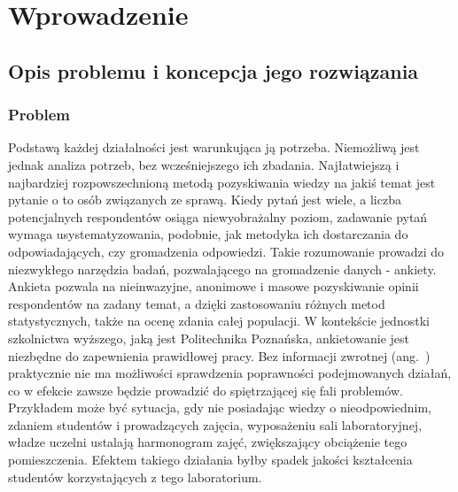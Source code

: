 \chapter{Wprowadzenie}
\label{Chapter1}

\section{Opis problemu i koncepcja jego rozwiązania}
\label{Chapter11}

\subsection{Problem}
\label{Chapter111}

Podstawą każdej działalności jest warunkująca ją potrzeba. Niemożliwą jest jednak analiza potrzeb, bez wcześniejszego ich zbadania. Najłatwiejszą i najbardziej rozpowszechnioną metodą pozyskiwania wiedzy na jakiś temat jest pytanie o to osób związanych ze sprawą. Kiedy pytań jest wiele, a liczba potencjalnych respondentów osiąga niewyobrażalny poziom, zadawanie pytań wymaga usystematyzowania, podobnie, jak metodyka ich dostarczania do odpowiadających, czy gromadzenia odpowiedzi. Takie rozumowanie prowadzi do niezwykłego narzędzia badań, pozwalającego na gromadzenie danych - ankiety. \\

Ankieta pozwala na nieinwazyjne, anonimowe i masowe pozyskiwanie opinii respondentów na zadany temat, a dzięki zastosowaniu różnych metod statystycznych, także na ocenę zdania całej populacji. W kontekście jednostki szkolnictwa wyższego, jaką jest Politechnika Poznańska, ankietowanie jest niezbędne do zapewnienia prawidłowej pracy. Bez informacji zwrotnej (ang.~) praktycznie nie ma możliwości sprawdzenia poprawności podejmowanych działań, co w efekcie zawsze będzie prowadzić do spiętrzającej się fali problemów. Przykładem może być sytuacja, gdy nie posiadając wiedzy o nieodpowiednim, zdaniem studentów i prowadzących zajęcia, wyposażeniu sali laboratoryjnej, władze uczelni ustalają harmonogram zajęć, zwiększający obciążenie tego pomieszczenia. Efektem takiego działania byłby spadek jakości kształcenia studentów korzystających z tego laboratorium. \\

